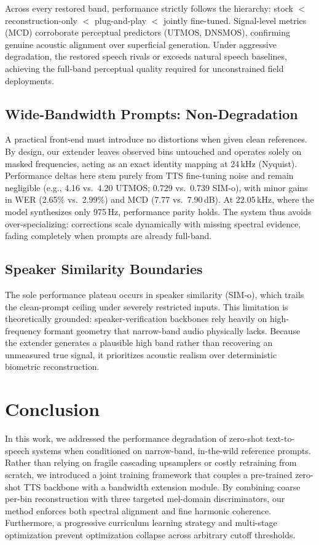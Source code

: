 \documentclass{article}
\begin{document}
Across every restored band, performance strictly follows the hierarchy: stock $<$ reconstruction-only $<$ plug-and-play $<$ jointly fine-tuned. Signal-level metrics (MCD) corroborate perceptual predictors (UTMOS, DNSMOS), confirming genuine acoustic alignment over superficial generation. Under aggressive degradation, the restored speech rivals or exceeds natural speech baselines, achieving the full-band perceptual quality required for unconstrained field deployments.

\subsection{Wide-Bandwidth Prompts: Non-Degradation}
A practical front-end must introduce no distortions when given clean references. By design, our extender leaves observed bins untouched and operates solely on masked frequencies, acting as an exact identity mapping at 24\,kHz (Nyquist). Performance deltas here stem purely from TTS fine-tuning noise and remain negligible (e.g., 4.16 vs.\ 4.20 UTMOS; 0.729 vs.\ 0.739 SIM-o), with minor gains in WER (2.65\% vs.\ 2.99\%) and MCD (7.77 vs.\ 7.90\,dB). At 22.05\,kHz, where the model synthesizes only 975\,Hz, performance parity holds. The system thus avoids over-specializing: corrections scale dynamically with missing spectral evidence, fading completely when prompts are already full-band.

\subsection{Speaker Similarity Boundaries}
The sole performance plateau occurs in speaker similarity (SIM-o), which trails the clean-prompt ceiling under severely restricted inputs. This limitation is theoretically grounded: speaker-verification backbones rely heavily on high-frequency formant geometry that narrow-band audio physically lacks. Because the extender generates a plausible high band rather than recovering an unmeasured true signal, it prioritizes acoustic realism over deterministic biometric reconstruction.
\section{Conclusion}
In this work, we addressed the performance degradation of zero-shot text-to-speech systems when conditioned on narrow-band, in-the-wild reference prompts. Rather than relying on fragile cascading upsamplers or costly retraining from scratch, we introduced a joint training framework that couples a pre-trained zero-shot TTS backbone with a bandwidth extension module. By combining coarse per-bin reconstruction with three targeted mel-domain discriminators, our method enforces both spectral alignment and fine harmonic coherence. Furthermore, a progressive curriculum learning strategy and multi-stage optimization prevent optimization collapse across arbitrary cutoff thresholds.
\end{document}
